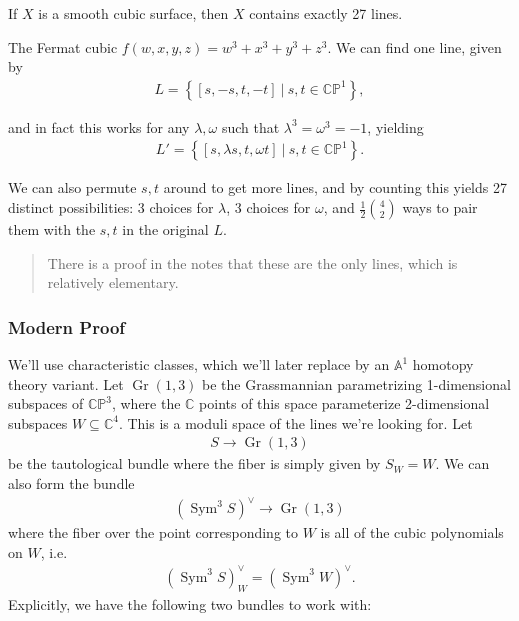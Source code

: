 \begin{theorem}

If \(X\) is a smooth cubic surface, then \(X\) contains exactly 27
lines.

\end{theorem}

\begin{example}[?]

The Fermat cubic \(f(w,x,y,z) = w^3 + x^3 + y^3 + z^3\). We can find one
line, given by
\begin{align*}
L = \left\{{[s,-s,t,-t] {~\mathrel{\Big|}~}s,t \in {\mathbb{CP}}^1}\right\},
\end{align*}

and in fact this works for any \(\lambda, \omega\) such that
\(\lambda^3 = \omega^3 = -1\), yielding
\begin{align*}
L' = \left\{{[s,\lambda s,t,\omega t] {~\mathrel{\Big|}~}s,t \in {\mathbb{CP}}^1}\right\}.
\end{align*}

We can also permute \(s,t\) around to get more lines, and by counting
this yields 27 distinct possibilities: 3 choices for \(\lambda\), 3
choices for \(\omega\), and \(\frac 1 2 {4\choose 2}\) ways to pair them
with the \(s,t\) in the original \(L\).

\begin{quote}
There is a proof in the notes that these are the only lines, which is
relatively elementary.
\end{quote}

\end{example}

\hypertarget{modern-proof}{%
\subsubsection{Modern Proof}\label{modern-proof}}

We'll use characteristic classes, which we'll later replace by an
\({\mathbb{A}}^1\) homotopy theory variant. Let
\({\operatorname{Gr}}(1,3)\) be the Grassmannian parametrizing
1-dimensional subspaces of \({\mathbb{CP}}^3\), where the
\({\mathbb{C}}\) points of this space parameterize 2-dimensional
subspaces \(W \subseteq {\mathbb{C}}^4\). This is a moduli space of the
lines we're looking for. Let
\begin{align*}S \to {\operatorname{Gr}}(1,3)\end{align*}
be the tautological bundle where the fiber is simply given by
\(S_W = W\). We can also form the bundle
\begin{align*}
(\operatorname{Sym}^3 S)^\vee\to {\operatorname{Gr}}(1,3)
\end{align*}
where the fiber over the point corresponding to \(W\) is all of the
cubic polynomials on \(W\), i.e.~
\begin{align*}(\operatorname{Sym}^3 S)^\vee_W = (\operatorname{Sym}^3 W)^\vee.\end{align*}
Explicitly, we have the following two bundles to work with:

